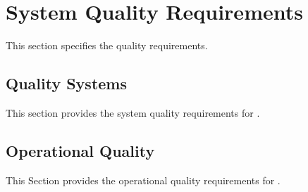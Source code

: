 \KNEADSECTIONNEWPAGE
\section{System Quality Requirements}
\label{lab:sec_Quality}



This section specifies the \ThisSys quality requirements.

\subsection{Quality Systems}
\label{lab:ssec_QualitySystems}


This section provides the system quality requirements for \ThisSys.

\subsection{Operational Quality}
\label{lab:ssec_OperationalQuality}
% 

This Section provides the operational quality requirements for \ThisSys.




% 




% 
